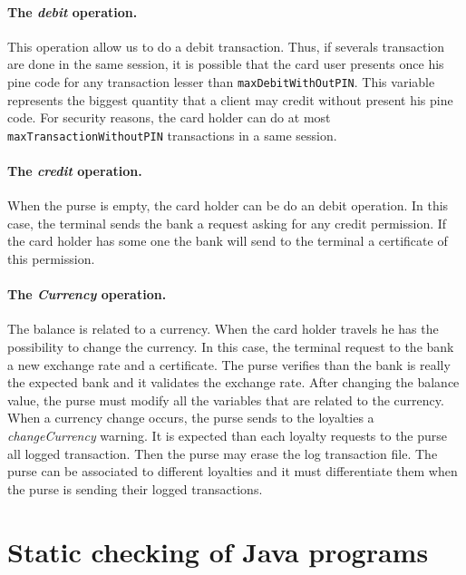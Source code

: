 \documentclass[a4paper]{llncs}
\begin{document}
\paragraph{The \textit{debit} operation.}
This operation allow us to do a debit transaction. Thus, if
severals transaction are done in the same session, it is possible that 
the card user presents once his pine code for any transaction lesser than
\texttt{maxDebitWithOutPIN}. This variable represents the biggest
quantity that a client may credit without present his pine code. For
security reasons, the card holder can do at most
\texttt{maxTransactionWithoutPIN} transactions in a same session. 


\paragraph{The \textit{credit} operation.} When the purse is empty, the 
card holder can be do an debit operation. In this case, the terminal
sends the bank a request asking for any credit permission. If the card 
holder has some one the bank will send to the terminal a certificate of 
this permission. 



\paragraph{The \textit{Currency} operation.} The balance is related to a
currency. When the card holder travels he has the possibility to
change the currency. In this case, the terminal request to the bank a
new exchange rate and a certificate. The purse verifies than the bank is 
really the expected bank and it validates the exchange rate. After
changing the balance value, the purse must modify all the variables
that are related to the currency. \\

When a currency change occurs, the purse sends to the loyalties a
\textit{changeCurrency} warning. It is expected than each loyalty
requests to the purse all logged transaction.  Then the purse may erase 
the log transaction file. The purse can be associated to different
loyalties and it must differentiate them when the purse is sending
their logged transactions. \\






\section{Static checking of Java programs}
\label{SectStatic}
\end{document}
